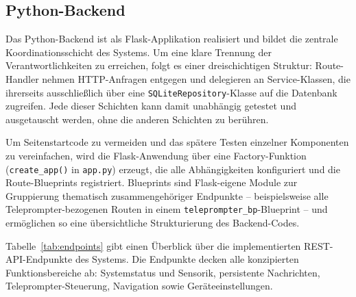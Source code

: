\subsection{Python-Backend}
\label{subsec:backendImpl}

Das Python-Backend ist als Flask-Applikation realisiert und bildet die zentrale
Koordinationsschicht des Systems.
Um eine klare Trennung der Verantwortlichkeiten zu erreichen, folgt es einer
dreischichtigen Struktur: Route-Handler nehmen HTTP-Anfragen entgegen und
delegieren an Service-Klassen, die ihrerseits ausschließlich über eine
\texttt{SQLiteRepository}-Klasse auf die Datenbank zugreifen.
Jede dieser Schichten kann damit unabhängig getestet und ausgetauscht werden,
ohne die anderen Schichten zu berühren.

Um Seitenstartcode zu vermeiden und das spätere Testen einzelner Komponenten zu
vereinfachen, wird die Flask-Anwendung über eine Factory-Funktion
(\texttt{create\_app()} in \texttt{app.py}) erzeugt, die alle Abhängigkeiten
konfiguriert und die Route-Blueprints registriert.
Blueprints sind Flask-eigene Module zur Gruppierung thematisch zusammengehöriger
Endpunkte -- beispielsweise alle Teleprompter-bezogenen Routen in einem
\texttt{teleprompter\_bp}-Blueprint -- und ermöglichen so eine übersichtliche
Strukturierung des Backend-Codes.

Tabelle~\ref{tab:endpoints} gibt einen Überblick über die implementierten
REST-API-Endpunkte des Systems.
Die Endpunkte decken alle konzipierten Funktionsbereiche ab: Systemstatus und
Sensorik, persistente Nachrichten, Teleprompter-Steuerung, Navigation sowie
Geräteeinstellungen.


